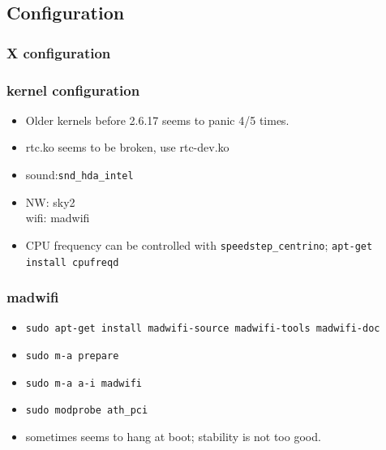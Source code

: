 \documentclass[cjk,dvipdfmx]{beamer}
\begin{document}
\subsection{Configuration}

\begin{frame}
 \frametitle{X configuration}
\end{frame}

\begin{frame}
 \frametitle{kernel configuration}
\begin{itemize}
 \item Older kernels before 2.6.17 seems to panic 4/5 times.
 \item rtc.ko seems to be broken, use rtc-dev.ko
 \item sound:\texttt{snd\_hda\_intel}
 \item NW: sky2\\
       wifi: madwifi
 \item CPU frequency can be controlled with \texttt{speedstep\_centrino};
       \texttt{apt-get install cpufreqd}
\end{itemize}
\end{frame}

\begin{frame}
 \frametitle{madwifi}
 \begin{itemize}
  \item \texttt{sudo apt-get install madwifi-source madwifi-tools madwifi-doc}
  \item \texttt{sudo m-a prepare}
  \item \texttt{sudo m-a a-i madwifi}
  \item \texttt{sudo modprobe ath\_pci}
  \item<2-> sometimes seems to hang at boot; stability is not too good.
 \end{itemize}
\end{frame}
\end{document}
